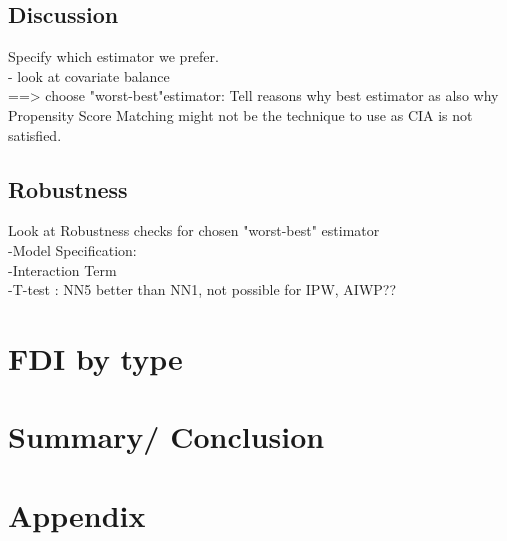 \documentclass[a4paper,11pt]{scrartcl}
\newcommand{\sectionnumbering}[1]{%
  \setcounter{section}{0}%
   \renewcommand{\thesection}{\csname #1\endcsname{section}}}
\begin{document}
\newpage
\subsection{Discussion}
Specify which estimator we prefer.\\
- look at covariate balance \\
==> choose "worst-best"estimator: Tell reasons why best estimator as also why Propensity Score Matching might not be the technique to use as CIA is not satisfied. 

\subsection{Robustness}
Look at Robustness checks for chosen "worst-best" estimator \\
-Model Specification: \\
-Interaction Term\\
-T-test : NN5 better than NN1, not possible for IPW, AIWP??






\section{FDI by type}

\section{Summary/ Conclusion}




\newpage






\section*{Appendix}
\sectionnumbering{Roman}
\setcounter{page}{3} %
\end{document}
